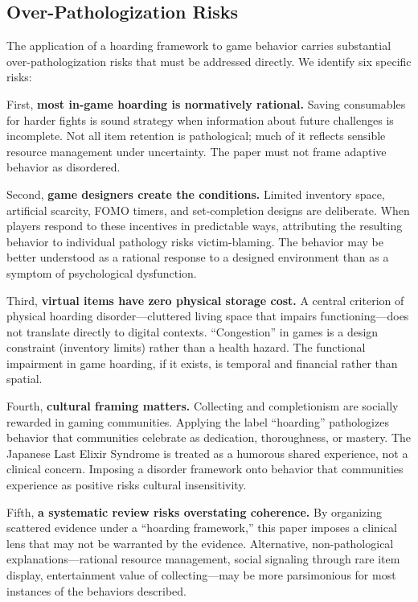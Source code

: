 \documentclass[12pt]{article}
\begin{document}
\subsection{Over-Pathologization Risks}

The application of a hoarding framework to game behavior carries substantial over-pathologization risks that must be addressed directly. We identify six specific risks:

First, \textbf{most in-game hoarding is normatively rational.} Saving consumables for harder fights is sound strategy when information about future challenges is incomplete. Not all item retention is pathological; much of it reflects sensible resource management under uncertainty. The paper must not frame adaptive behavior as disordered.

Second, \textbf{game designers create the conditions.} Limited inventory space, artificial scarcity, FOMO timers, and set-completion designs are deliberate. When players respond to these incentives in predictable ways, attributing the resulting behavior to individual pathology risks victim-blaming. The behavior may be better understood as a rational response to a designed environment than as a symptom of psychological dysfunction.

Third, \textbf{virtual items have zero physical storage cost.} A central criterion of physical hoarding disorder---cluttered living space that impairs functioning---does not translate directly to digital contexts. ``Congestion'' in games is a design constraint (inventory limits) rather than a health hazard. The functional impairment in game hoarding, if it exists, is temporal and financial rather than spatial.

Fourth, \textbf{cultural framing matters.} Collecting and completionism are socially rewarded in gaming communities. Applying the label ``hoarding'' pathologizes behavior that communities celebrate as dedication, thoroughness, or mastery. The Japanese Last Elixir Syndrome is treated as a humorous shared experience, not a clinical concern. Imposing a disorder framework onto behavior that communities experience as positive risks cultural insensitivity.

Fifth, \textbf{a systematic review risks overstating coherence.} By organizing scattered evidence under a ``hoarding framework,'' this paper imposes a clinical lens that may not be warranted by the evidence. Alternative, non-pathological explanations---rational resource management, social signaling through rare item display, entertainment value of collecting---may be more parsimonious for most instances of the behaviors described.
\end{document}
